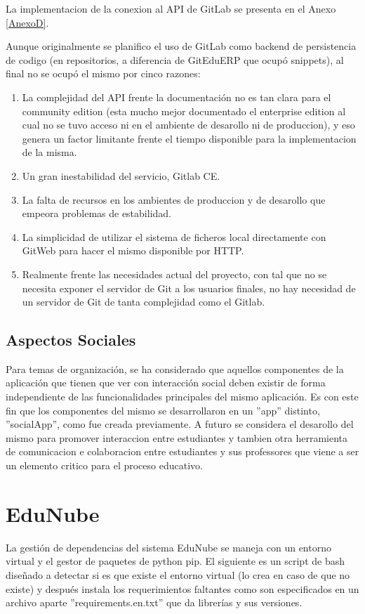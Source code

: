 La implementacion de la conexion al API de GitLab se presenta en el Anexo \ref{AnexoD}.

Aunque originalmente se planifico el uso de GitLab como backend de persistencia de codigo (en repositorios, a diferencia de GitEduERP que ocupó snippets), al final no se ocupó el mismo por cinco razones:
\begin{enumerate}
  \item La complejidad del API frente la documentación no es tan clara para el community edition (esta mucho mejor documentado el enterprise edition al cual no se tuvo acceso ni en el ambiente de desarollo ni de produccion), y eso genera un factor limitante frente el tiempo disponible para la implementacion de la misma.
  \item Un gran inestabilidad del servicio, Gitlab CE.
  \item La falta de recursos en los ambientes de produccion y de desarollo que empeora problemas de estabilidad.
  \item La simplicidad de utilizar el sistema de ficheros local directamente con GitWeb para hacer el mismo disponible por HTTP.
  \item Realmente frente las necesidades actual del proyecto, con tal que no se necesita exponer el servidor de Git a los usuarios finales, no hay necesidad de un servidor de Git de tanta complejidad como el Gitlab.
\end{enumerate}

\subsection{Aspectos Sociales}
Para temas de organización, se ha considerado que aquellos componentes de la aplicación que tienen que ver con interacción social deben existir de forma independiente de las funcionalidades principales del mismo aplicación. Es con este fin que los componentes del mismo se desarrollaron en un ''app'' distinto, ''socialApp'', como fue creada previamente. A futuro se considera el desarollo del mismo para promover interaccion entre estudiantes y tambien otra herramienta de comunicacion e colaboracion entre estudiantes y sus professores que viene a ser un elemento critico para el proceso educativo.

\section{EduNube}
La gestión de dependencias del sistema EduNube se maneja con un entorno virtual y el gestor de paquetes de python pip. El siguiente es un script de bash diseñado a detectar si es que existe el entorno virtual (lo crea en caso de que no existe) y después instala los requerimientos faltantes como son especificados en un archivo aparte ''requirements.en.txt'' que da librerías y sus versiones.

